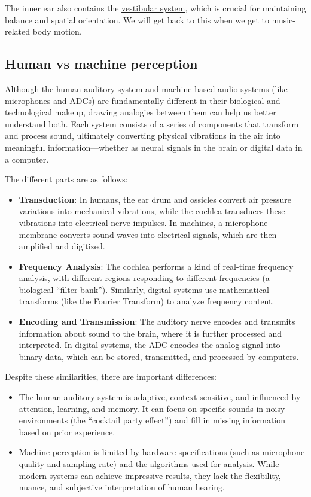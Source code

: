 \documentclass{article}
\begin{document}
The inner ear also contains the \href{https://en.wikipedia.org/wiki/Vestibular\_system}{vestibular system}, which is crucial for maintaining balance and spatial orientation. We will get back to this when we get to music-related body motion.

\subsection{Human vs machine perception}

Although the human auditory system and machine-based audio systems (like microphones and ADCs) are fundamentally different in their biological and technological makeup, drawing analogies between them can help us better understand both. Each system consists of a series of components that transform and process sound, ultimately converting physical vibrations in the air into meaningful information---whether as neural signals in the brain or digital data in a computer.

The different parts are as follows:

\begin{itemize}
\item \textbf{Transduction}: In humans, the ear drum and ossicles convert air pressure variations into mechanical vibrations, while the cochlea transduces these vibrations into electrical nerve impulses. In machines, a microphone membrane converts sound waves into electrical signals, which are then amplified and digitized.
\item \textbf{Frequency Analysis}: The cochlea performs a kind of real-time frequency analysis, with different regions responding to different frequencies (a biological ``filter bank''). Similarly, digital systems use mathematical transforms (like the Fourier Transform) to analyze frequency content.
\item \textbf{Encoding and Transmission}: The auditory nerve encodes and transmits information about sound to the brain, where it is further processed and interpreted. In digital systems, the ADC encodes the analog signal into binary data, which can be stored, transmitted, and processed by computers.
\end{itemize}

Despite these similarities, there are important differences:

\begin{itemize}
\item The human auditory system is adaptive, context-sensitive, and influenced by attention, learning, and memory. It can focus on specific sounds in noisy environments (the ``cocktail party effect'') and fill in missing information based on prior experience.
\item Machine perception is limited by hardware specifications (such as microphone quality and sampling rate) and the algorithms used for analysis. While modern systems can achieve impressive results, they lack the flexibility, nuance, and subjective interpretation of human hearing.
\end{itemize}
\end{document}
